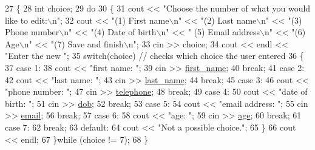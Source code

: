 \begin{DoxyCode}
27 \{
28    \textcolor{keywordtype}{int} choice;
29    \textcolor{keywordflow}{do}
30    \{
31       cout << \textcolor{stringliteral}{"Choose the number of what you would like to edit:\(\backslash\)n"};
32       cout << \textcolor{stringliteral}{"(1) First name\(\backslash\)n"} << \textcolor{stringliteral}{"(2) Last name\(\backslash\)n"} << \textcolor{stringliteral}{"(3) Phone number\(\backslash\)n"} << \textcolor{stringliteral}{"(4) Date of birth\(\backslash\)n"} << \textcolor{stringliteral}{"
      (5) Email address\(\backslash\)n"} << \textcolor{stringliteral}{"(6) Age\(\backslash\)n"} << \textcolor{stringliteral}{"(7) Save and finish\(\backslash\)n"};
33       cin >> choice;
34       cout << endl << \textcolor{stringliteral}{"Enter the new "};
35       \textcolor{keywordflow}{switch}(choice) \textcolor{comment}{// checks which choice the user entered                                               
                                                                                                       }
36       \{
37          \textcolor{keywordflow}{case} 1:
38             cout << \textcolor{stringliteral}{"first name: "};
39             cin >> \hyperlink{classContact_ac074ba210aa0e4a52921af8353384a59}{first\_name};
40             \textcolor{keywordflow}{break};
41          \textcolor{keywordflow}{case} 2:
42             cout << \textcolor{stringliteral}{"last name: "};
43             cin >> \hyperlink{classContact_a87032ae00ab0e8cc81d660f191bcf0fa}{last\_name};
44             \textcolor{keywordflow}{break};
45          \textcolor{keywordflow}{case} 3:
46             cout << \textcolor{stringliteral}{"phone number: "};
47             cin >> \hyperlink{classContact_ad23a96ecf0527e8878da50da682ba794}{telephone};
48             \textcolor{keywordflow}{break};
49          \textcolor{keywordflow}{case} 4:
50             cout << \textcolor{stringliteral}{"date of birth: "};
51             cin >> \hyperlink{classContact_a50397132da5dc66f2cb289fc650c3df6}{dob};
52             \textcolor{keywordflow}{break};
53          \textcolor{keywordflow}{case} 5:
54             cout << \textcolor{stringliteral}{"email address: "};
55             cin >> \hyperlink{classContact_a7cb8a0ab45d0ddc7a83df39590fcb6c1}{email};
56             \textcolor{keywordflow}{break};
57          \textcolor{keywordflow}{case} 6:
58             cout << \textcolor{stringliteral}{"age: "};
59             cin >> \hyperlink{classPersonalContact_a5608489f547f4d3fbe57069463862e42}{age};
60             \textcolor{keywordflow}{break};
61          \textcolor{keywordflow}{case} 7:
62             \textcolor{keywordflow}{break};
63          \textcolor{keywordflow}{default}:
64             cout << \textcolor{stringliteral}{"Not a possible choice."};
65       \}
66       cout << endl;
67    \}\textcolor{keywordflow}{while} (choice != 7);
68 \}
\end{DoxyCode}
